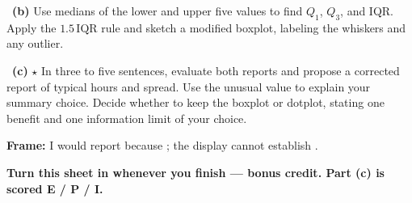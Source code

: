 \documentclass[11pt]{article}
\begin{document}
~\textbf{(b)} Use medians of the lower and upper five values to find $Q_1$, $Q_3$, and IQR. Apply the $1.5\,\mathrm{IQR}$ rule and sketch a modified boxplot, labeling the whiskers and any outlier.\par
\workspace{1.3in}

~\textbf{(c)} $\star$ In three to five sentences, evaluate both reports and propose a corrected report of typical hours and spread. Use the unusual value to explain your summary choice. Decide whether to keep the boxplot or dotplot, stating one benefit and one information limit of your choice.\par
\workspace{2.1in}

\begin{sentenceframebox}\raggedright\textbf{Frame:} I would report \blank[1.5in] because \blank[2.6in]; the display cannot establish \blank[2in].\end{sentenceframebox}

\textbf{Turn this sheet in whenever you finish --- bonus credit. Part (c) is scored E / P / I.}\par
\end{document}
